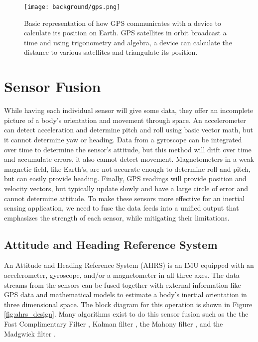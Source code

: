 \begin{figure}[h!]
    \caption[GPS diagram]{Basic representation of how GPS communicates with a device to calculate its position on Earth.
    GPS satellites in orbit broadcast a time and using trigonometry and algebra, a device can calculate the distance to various satellites and triangulate its position.}
    \centering
    \texttt{[image: background/gps.png]}
\end{figure}

\section{Sensor Fusion} 
While having each individual sensor will give some data, they offer an incomplete picture of a body's orientation and movement through space.
An accelerometer can detect acceleration and determine pitch and roll using basic vector math, but it cannot determine yaw or heading.
Data from a gyroscope can be integrated over time to determine the sensor's attitude, but this method will drift over time and accumulate errors, it also cannot detect movement.
Magnetometers in a weak magnetic field, like Earth's, are not accurate enough to determine roll and pitch, but can easily provide heading.
Finally, GPS readings will provide position and velocity vectors, but typically update slowly and have a large circle of error and cannot determine attitude.
To make these sensors more effective for an inertial sensing application, we need to fuse the data feeds into a unified output that emphasizes the strength of each sensor, while mitigating their limitations.

\subsection{Attitude and Heading Reference System} 
An Attitude and Heading Reference System (AHRS) is an IMU equipped with an accelerometer, gyroscope, and/or a magnetometer in all three axes.
The data streams from the sensors can be fused together with external information like GPS data and mathematical models to estimate a body's inertial orientation in three dimensional space.
The block diagram for this operation is shown in Figure \ref{fig:ahrs_design}.
Many algorithms exist to do this sensor fusion such as the the Fast Complimentary Filter \cite{FCF:2016}, Kalman filter \cite{Kalman:1960}, the Mahony filter \cite{Mahony:2008}, and the Madgwick filter \cite{Madgwick:dissertation}.

